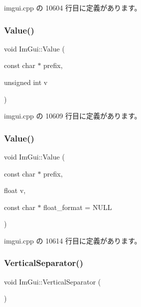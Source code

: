  imgui.\+cpp の 10604 行目に定義があります。

\mbox{\label{namespace_im_gui_aec80a3e35bf7c1ff5704334e5a3ebd5a}} 
\subsubsection{\texorpdfstring{Value()}{Value()}\hspace{0.1cm}{\footnotesize\ttfamily [3/4]}}
{\footnotesize\ttfamily void Im\+Gui\+::\+Value (\begin{DoxyParamCaption}\item[{const char $\ast$}]{prefix,  }\item[{unsigned int}]{v }\end{DoxyParamCaption})}



 imgui.\+cpp の 10609 行目に定義があります。

\mbox{\label{namespace_im_gui_a0c8b87438082a1d0a46ae2a76090ca16}} 
\subsubsection{\texorpdfstring{Value()}{Value()}\hspace{0.1cm}{\footnotesize\ttfamily [4/4]}}
{\footnotesize\ttfamily void Im\+Gui\+::\+Value (\begin{DoxyParamCaption}\item[{const char $\ast$}]{prefix,  }\item[{float}]{v,  }\item[{const char $\ast$}]{float\+\_\+format = {\ttfamily NULL} }\end{DoxyParamCaption})}



 imgui.\+cpp の 10614 行目に定義があります。

\mbox{\label{namespace_im_gui_ae60f7b8ece8808c477796e6594c8d796}} 
\subsubsection{\texorpdfstring{Vertical\+Separator()}{VerticalSeparator()}}
{\footnotesize\ttfamily void Im\+Gui\+::\+Vertical\+Separator (\begin{DoxyParamCaption}{ }\end{DoxyParamCaption})}



